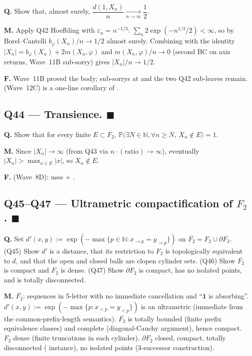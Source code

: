 \documentclass[11pt,a4paper]{article}
\newcommand{\done}[1]{\textcolor{donegreen}{\textbf{#1}}}
\newcommand{\N}{\mathbb{N}}
\newcommand{\FG}{F_2}
\newcommand{\BFG}{\partial F_2}
\newcommand{\cpt}{\overline{F_2}}
\theoremstyle{plain}
\theoremstyle{definition}
\begin{document}
\textbf{Q.} Show that, almost surely,
$\dfrac{d(1, X_n)}{n} \xrightarrow[n\to\infty]{} \dfrac{1}{2}$.

\textbf{M.} Apply Q42 Hoeffding with $\varepsilon_n = n^{-1/3}$:
$\sum_n 2 \exp(-n^{1/3}/2) < \infty$, so by Borel--Cantelli
$b_\varphi(X_n)/n \to 1/2$ almost surely. Combining with the
identity $|X_n| = b_\varphi(X_n) + 2 m(X_n, \varphi)$ and
$m(X_n, \varphi)/n \to 0$ (second BC on axis returns, Wave~11B
sub-sorry) gives $|X_n|/n \to 1/2$.

\textbf{F.} Wave~11B proved the body; sub-sorrys at
 and the two Q42 sub-leaves remain.
 (Wave~12C) is a one-line
corollary of .

\subsection{Q44 --- Transience. \done{$\blacksquare$}}

\textbf{Q.} Show that for every finite $E \subset F_2$,
$\mathbb P\bigl(\exists N \in \N, \forall n \geq N,\ X_n \notin E\bigr) = 1$.

\textbf{M.} Since $|X_n| \to \infty$ (from Q43 via
$n \cdot (\text{ratio}) \to \infty$), eventually
$|X_n| > \max_{x \in E} |x|$, so $X_n \notin E$.

\textbf{F.}  (Wave~8D): uses
 + .

\subsection{Q45--Q47 --- Ultrametric compactification of $\FG$. \done{$\blacksquare$}}

\textbf{Q.} Set $d'(x, y) := \exp(-\max\{p \in \N : x_{\to p} = y_{\to p}\})$
on $\overline{F_2} = F_2 \cup \partial F_2$.
(Q45) Show $d'$ is a distance, that its restriction to $F_2$ is
topologically equivalent to $d$, and that the open and closed balls
are clopen cylinder sets. (Q46) Show $\overline{F_2}$ is compact
and $F_2$ is dense. (Q47) Show $\partial F_2$ is compact, has no
isolated points, and is totally disconnected.

\textbf{M.} $\cpt$: sequences in 5-letter  with no
immediate cancellation and ``$\mathbf 1$ is absorbing''.
$d'(x, y) := \exp(-\max\{p : x_{<p} = y_{<p}\})$ is an ultrametric
(immediate from the common-prefix-length semantics). $\cpt$ is
totally bounded (finite prefix equivalence classes) and complete
(diagonal-Cauchy argument), hence compact. $\FG$ dense (finite
truncations in each cylinder). $\BFG$ closed, compact, totally
disconnected ( instance), no isolated
points (3-successor construction).
\end{document}
